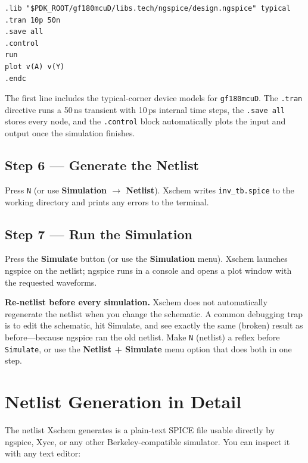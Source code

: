 \documentclass[11pt]{article}
\begin{document}
\begin{lstlisting}
.lib "$PDK_ROOT/gf180mcuD/libs.tech/ngspice/design.ngspice" typical
.tran 10p 50n
.save all
.control
run
plot v(A) v(Y)
.endc
\end{lstlisting}

The first line includes the typical-corner device models for
\texttt{gf180mcuD}.
The \texttt{.tran} directive runs a 50\,ns transient with 10\,ps
internal time steps, the \texttt{.save all} stores every node, and the
\texttt{.control} block automatically plots the input and output once
the simulation finishes.

\subsection{Step 6 --- Generate the Netlist}

Press \texttt{N} (or use \textbf{Simulation $\rightarrow$ Netlist}).
Xschem writes \texttt{inv\_tb.spice} to the working directory and
prints any errors to the terminal.

\subsection{Step 7 --- Run the Simulation}

Press the \textbf{Simulate} button (or use the \textbf{Simulation}
menu).
Xschem launches ngspice on the netlist; ngspice runs in a console and
opens a plot window with the requested waveforms.

\begin{tipbox}
\textbf{Re-netlist before every simulation.}
Xschem does not automatically regenerate the netlist when you change
the schematic.
A common debugging trap is to edit the schematic, hit Simulate, and see
exactly the same (broken) result as before---because ngspice ran the
old netlist.
Make \texttt{N} (netlist) a reflex before \texttt{Simulate}, or use the
\textbf{Netlist + Simulate} menu option that does both in one step.
\end{tipbox}

\section{Netlist Generation in Detail}

The netlist Xschem generates is a plain-text SPICE file usable directly
by ngspice, Xyce, or any other Berkeley-compatible simulator.
You can inspect it with any text editor:
\end{document}
